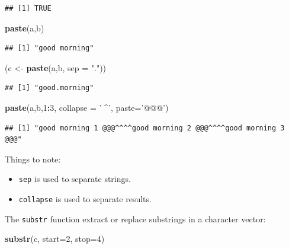 \documentclass[]{book}
\newenvironment{Shaded}{\begin{snugshade}}{\end{snugshade}}
\newcommand{\KeywordTok}[1]{\textcolor[rgb]{0.13,0.29,0.53}{\textbf{#1}}}
\newcommand{\DataTypeTok}[1]{\textcolor[rgb]{0.13,0.29,0.53}{#1}}
\newcommand{\DecValTok}[1]{\textcolor[rgb]{0.00,0.00,0.81}{#1}}
\newcommand{\StringTok}[1]{\textcolor[rgb]{0.31,0.60,0.02}{#1}}
\newcommand{\OperatorTok}[1]{\textcolor[rgb]{0.81,0.36,0.00}{\textbf{#1}}}
\newcommand{\NormalTok}[1]{#1}
\providecommand{\tightlist}{%
  \setlength{\itemsep}{0pt}\setlength{\parskip}{0pt}}
\theoremstyle{definition}
\theoremstyle{definition}
\theoremstyle{definition}
\theoremstyle{remark}
\begin{document}
\begin{verbatim}
## [1] TRUE
\end{verbatim}

\begin{Shaded}
\begin{Highlighting}[]
\KeywordTok{paste}\NormalTok{(a,b)}
\end{Highlighting}
\end{Shaded}

\begin{verbatim}
## [1] "good morning"
\end{verbatim}

\begin{Shaded}
\begin{Highlighting}[]
\NormalTok{(c <-}\StringTok{ }\KeywordTok{paste}\NormalTok{(a,b, }\DataTypeTok{sep =} \StringTok{"."}\NormalTok{))}
\end{Highlighting}
\end{Shaded}

\begin{verbatim}
## [1] "good.morning"
\end{verbatim}

\begin{Shaded}
\begin{Highlighting}[]
\KeywordTok{paste}\NormalTok{(a,b,}\DecValTok{1}\OperatorTok{:}\DecValTok{3}\NormalTok{, }\DataTypeTok{collapse =} \StringTok{'^^^^'}\NormalTok{, }\DataTypeTok{paste=}\StringTok{'@@@'}\NormalTok{)}
\end{Highlighting}
\end{Shaded}

\begin{verbatim}
## [1] "good morning 1 @@@^^^^good morning 2 @@@^^^^good morning 3 @@@"
\end{verbatim}

Things to note:

\begin{itemize}
\tightlist
\item
  \texttt{sep} is used to separate strings.
\item
  \texttt{collapse} is used to separate results.
\end{itemize}

The \texttt{substr} function extract or replace substrings in a
character vector:

\begin{Shaded}
\begin{Highlighting}[]
\KeywordTok{substr}\NormalTok{(c, }\DataTypeTok{start=}\DecValTok{2}\NormalTok{, }\DataTypeTok{stop=}\DecValTok{4}\NormalTok{)}
\end{Highlighting}
\end{Shaded}
\end{document}
